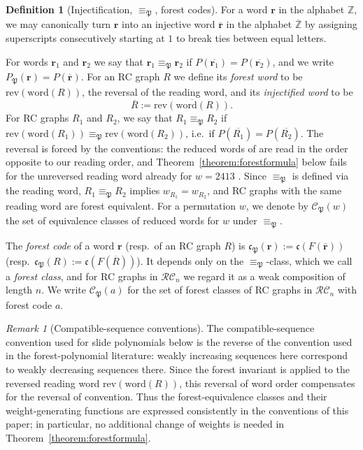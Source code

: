 \documentclass{amsart}
\theoremstyle{definition}
\newtheorem{definition}[lemma]{Definition}
\theoremstyle{remark}
\newtheorem*{remark}{Remark}
\numberwithin{equation}{subsection}
\newcommand{\wof}[1]{w_{#1}}
\newcommand{\RC}{\mathcal{RC}}
\newcommand{\code}{\mathfrak{c}}
\newcommand{\forest}{\mathfrak{P}}
\newcommand{\finv}{P_{\forest}}
\begin{document}
\begin{definition}[Injectification, $\equiv_\forest$, forest codes]\label{definition:forestequiv}
  For a word $\mathbf{r}$ in the alphabet $\mathbb{Z}$, we may canonically turn $\mathbf{r}$ into an injective word $\overline{\mathbf r}$ in the alphabet $\overline{\mathbb{Z}}$ by assigning superscripts consecutively starting at $1$ to break ties between equal letters.

For words $\mathbf{r}_1$ and $\mathbf{r}_2$ we say that $\mathbf{r}_1\equiv_\forest\mathbf{r}_2$ if $P(\overline{\mathbf{r}_1}) = P(\overline{\mathbf{r}_2})$, and we write $\finv(\mathbf r)=P(\overline{\mathbf r})$. For an RC graph $R$ we define its \emph{forest word} to be $\mathrm{rev}(\mathrm{word}(R))$, the reversal of the reading word, and its \emph{injectified word} to be
$$\overline{R} := \overline{\mathrm{rev}(\mathrm{word}(R))}.$$
For RC graphs $R_1$ and $R_2$, we say that $R_1\equiv_\forest R_2$ if $\mathrm{rev}(\mathrm{word}(R_1))\equiv_\forest \mathrm{rev}(\mathrm{word}(R_2))$, i.e.\ if $P(\overline{R_1})=P(\overline{R_2})$. The reversal is forced by the conventions: the reduced words of \cite{nadeau2024forest} are read in the order opposite to our reading order, and Theorem~\ref{theorem:forestformula} below fails for the unreversed reading word already for $w=2413$ \cite[Definition~\ref*{B-definition:forestequiv}]{samuelbialgebra}. Since $\equiv_\forest$ is defined via the reading word, $R_1\equiv_\forest R_2$ implies $\wof{R_1}=\wof{R_2}$, and RC graphs with the same reading word are forest equivalent. For a permutation $w$, we denote by $\mathcal{C}_\forest(w)$ the set of equivalence classes of reduced words for $w$ under $\equiv_\forest$.

The \emph{forest code} of a word $\mathbf r$ (resp.\ of an RC graph $R$) is $\code_\forest(\mathbf r) := \code(F(\overline{\mathbf r}))$ (resp.\ $\code_\forest(R):=\code(F(\overline{R}))$). It depends only on the $\equiv_\forest$-class, which we call a \emph{forest class}, and for RC graphs in $\RC_n$ we regard it as a weak composition of length $n$. We write $\mathcal{C}_\forest(a)$ for the set of forest classes of RC graphs in $\RC_n$ with forest code $a$.
\end{definition}

\begin{remark}[Compatible-sequence conventions]
The compatible-sequence convention used for slide polynomials below is the reverse of the convention used in the forest-polynomial literature: weakly increasing sequences here correspond to weakly decreasing sequences there. Since the forest invariant is applied to the reversed reading word $\mathrm{rev}(\mathrm{word}(R))$, this reversal of word order compensates for the reversal of convention. Thus the forest-equivalence classes and their weight-generating functions are expressed consistently in the conventions of this paper; in particular, no additional change of weights is needed in Theorem~\ref{theorem:forestformula}.
\end{remark}
\end{document}
